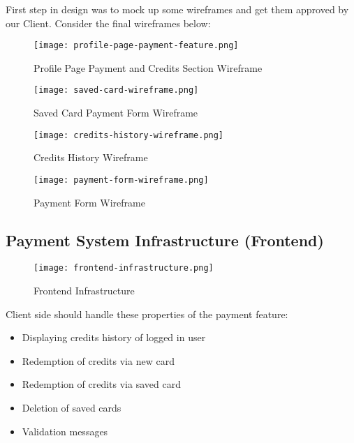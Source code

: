 First step in design was to mock up some wireframes and get them approved by our Client. Consider the final wireframes below:\\

\begin{figure}[!hbt]
  \centering
 	\texttt{[image: profile-page-payment-feature.png]}
  \caption{Profile Page Payment and Credits Section Wireframe}
 	\label{fig:profile-wireframe}
\end{figure}

\begin{figure}[!hbt]
  \centering
 	\texttt{[image: saved-card-wireframe.png]}
  \caption{Saved Card Payment Form Wireframe}
 	\label{fig:saved-card-wireframe}
\end{figure}

\begin{figure}[!hbt]
  \centering
 	\texttt{[image: credits-history-wireframe.png]}
  \caption{Credits History Wireframe}
 	\label{fig:credits-history-wireframe}
\end{figure}

\begin{figure}[!hbt]
  \centering
 	\texttt{[image: payment-form-wireframe.png]}
  \caption{Payment Form Wireframe}
 	\label{fig:payment-form-wireframe}
\end{figure}

\subsection{Payment System Infrastructure (Frontend)}
\label{subsec:payment-system-infrastructure}

\begin{figure}[!hbt]
  \centering
 	\texttt{[image: frontend-infrastructure.png]}
  \caption{Frontend Infrastructure}
 	\label{fig:frontend-infrastructure-diagram}
\end{figure}

Client side should handle these properties of the payment feature:

\begin{itemize}
\item Displaying credits history of logged in user
\item Redemption of credits via new card
\item Redemption of credits via saved card
\item Deletion of saved cards
\item Validation messages
\end{itemize}

